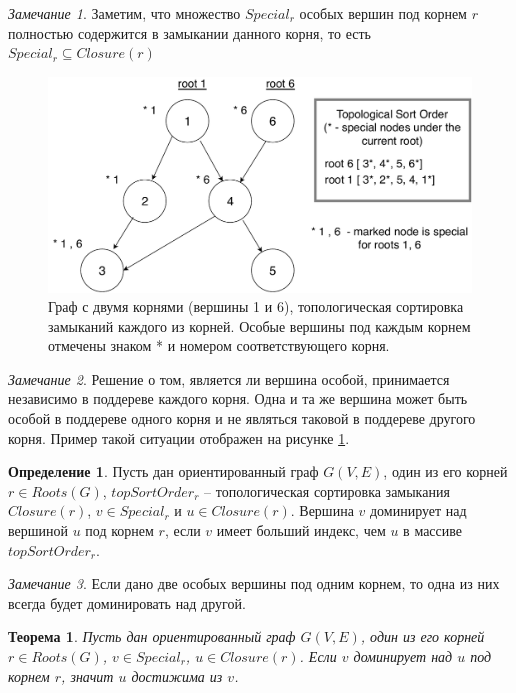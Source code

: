 \documentclass[12pt,a4paper,oneside,openany]{article}
\newtheorem{theorem}{Теорема}
\theoremstyle{definition}
\newtheorem{definition}{Определение}[]
\theoremstyle{lemma}
\theoremstyle{remark}
\newtheorem{remark}{Замечание}[]
\begin{document}
\begin{remark}
Заметим, что множество $Special_r$ особых вершин под корнем $r$ полностью содержится в замыкании данного корня, то есть $Special_r \subseteq Closure(r)$
\end{remark}

\begin{figure}[H]
      \centering
      \includegraphics[width=0.8\linewidth]{images/special_nodes.pdf}
      \caption{Граф с двумя корнями (вершины 1 и 6), топологическая сортировка замыканий каждого из корней. Особые вершины под каждым корнем отмечены знаком * и номером соответствующего корня.}
      \label{fig:specialnodes}
\end{figure}

\begin{remark}
Решение о том, является ли вершина особой,
принимается независимо в поддереве каждого корня.
Одна и та же вершина может быть особой в поддереве одного корня
и не являться таковой в поддереве другого корня. Пример такой ситуации отображен на рисунке \ref{fig:specialnodes}.
\end{remark}

\begin{definition}
Пусть дан ориентированный граф $G(V,E)$, один из его корней $r \in Roots(G)$,
$topSortOrder_r$ -- топологическая сортировка замыкания $Closure(r)$, $v \in Special_r$ и $u \in Closure(r)$.
Вершина $v$ доминирует над вершиной $u$ под корнем $r$, если $v$ имеет больший индекс, чем $u$ в массиве $topSortOrder_r$.
\end{definition}

\begin{remark}
Если дано две особых вершины под одним корнем, то одна из них всегда будет доминировать над другой.
\end{remark}

\begin{theorem}
Пусть дан ориентированный граф $G(V,E)$, один из его корней $r \in Roots(G)$,
$v \in Special_r$, $u \in Closure(r)$. Если $v$ доминирует над $u$ под корнем $r$, значит $u$ достижима из $v$.
\end{theorem}
\end{document}
